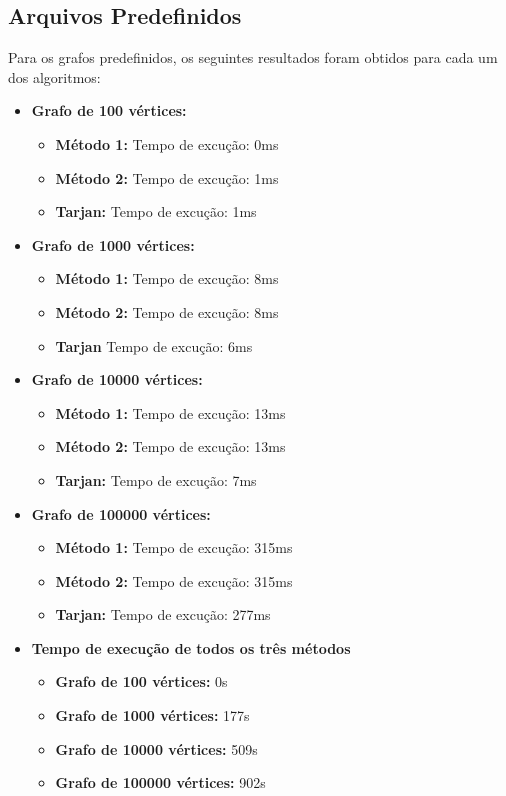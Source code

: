\subsection{Arquivos Predefinidos}

Para os grafos predefinidos, os seguintes resultados foram obtidos para cada um dos algoritmos:

\begin{itemize}
    \item \textbf{Grafo de 100 vértices:} 
    \begin{itemize}
        \item \textbf{Método 1:} Tempo de excução: 0ms
        \item \textbf{Método 2:} Tempo de excução: 1ms
        \item \textbf{Tarjan:} Tempo de excução: 1ms
    \end{itemize}
    \item \textbf{Grafo de 1000 vértices:} 
    \begin{itemize}
        \item \textbf{Método 1: } Tempo de excução: 8ms
        \item \textbf{Método 2:} Tempo de excução: 8ms
        \item \textbf{Tarjan} Tempo de excução: 6ms
    \end{itemize}
    \item \textbf{Grafo de 10000 vértices:}
    \begin{itemize}
        \item \textbf{Método 1:} Tempo de excução: 13ms
        \item \textbf{Método 2:} Tempo de excução: 13ms
        \item \textbf{Tarjan:} Tempo de excução: 7ms
    \end{itemize}
     \item \textbf{Grafo de 100000 vértices:}
    \begin{itemize}
        \item \textbf{Método 1:} Tempo de excução:  315ms
        \item \textbf{Método 2:} Tempo de excução: 315ms
        \item \textbf{Tarjan:} Tempo de excução: 277ms
    \end{itemize}
    
    \item \textbf{Tempo de execução de todos os três métodos}
    \begin{itemize}
        \item \textbf{Grafo de 100 vértices: } 0s
        \item \textbf{Grafo de 1000 vértices: } 177s
        \item \textbf{Grafo de 10000 vértices: } 509s
        \item \textbf{Grafo de 100000 vértices: } 902s
    \end{itemize}
    
\end{itemize}

